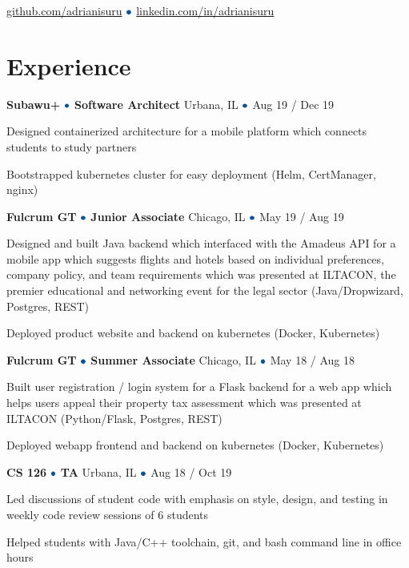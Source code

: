 \documentclass[hidelinks,11pt]{extarticle}
\let\boringbullet\bullet
\renewcommand{\bullet}{\color{mycolor}{\boringbullet}}
\newcommand{\position}[5]{
    {\textbf{#1}} $\bullet$ {\textbf{#2}}
	\hfill{\small#4 $\bullet$ #3}
    \begin{citemize}
        #5
    \end{citemize}
}
\begin{document}
\flushleft
{\Huge\bfseries{\color{mycolor}{Adrian Herath}}}

{\small
\href{https://github.com/adrianisuru/}{github.com/adrianisuru}
$\bullet$ %
\href{https://www.linkedin.com/in/adrianisuru/}{linkedin.com/in/adrianisuru}
}
\section{Experience}

\position
{Subawu+}
{Software Architect}
{Aug 19 {\color{mycolor}/} Dec 19}
{Urbana, IL}
{
\item Designed containerized architecture for a mobile platform which connects 
    students to study partners
\item Bootstrapped kubernetes cluster for easy deployment (Helm, CertManager, nginx)
}

\position
{Fulcrum GT}
{Junior Associate}
{May 19 {\color{mycolor}/} Aug 19}
{Chicago, IL}
{
    \item Designed and built Java backend which interfaced with 
            the Amadeus API 
    for a mobile app which suggests
        flights and hotels based on individual preferences, company policy,
        and team requirements 
    which was presented at ILTACON, the premier educational and networking 
        event for the legal sector (Java/Dropwizard, Postgres, REST)
    \item Deployed product website and backend on kubernetes (Docker, Kubernetes)
}

\position
{Fulcrum GT}
{Summer Associate}
{May 18 {\color{mycolor}/} Aug 18}
{Chicago, IL}
{
    \item Built user registration / login system for a Flask backend 
    for a web app which helps users appeal their property tax assessment 
    which was presented at ILTACON (Python/Flask, Postgres, REST)
    \item Deployed webapp frontend and backend on kubernetes (Docker, Kubernetes)
}

\position
{CS 126}
{TA}
{Aug 18 {\color{mycolor}/} Oct 19}
{Urbana, IL}
{
    \item Led discussions of student code with emphasis on style, design, and
        testing in weekly code review sessions of 6 students
    \item Helped students with Java/C++ toolchain, git, and bash command line in
        office hours
}
\end{document}
